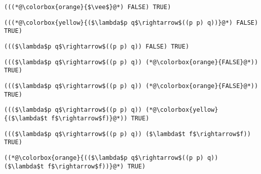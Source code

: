 \documentclass{beamer}
\begin{document}
\begin{frame}[fragile]{\CurrentSection}
\lstset{basicstyle=\ttfamily\small}\lstset{numbers=none}\lstset{language=ML}\begin{lstlisting}
(((*@\colorbox{orange}{$\vee$}@*) FALSE) TRUE)
\end{lstlisting}
\pause\lstset{language=ML}\begin{lstlisting}
(((*@\colorbox{yellow}{($\lambda$p q$\rightarrow$((p p) q))}@*) FALSE) TRUE)
\end{lstlisting}

\end{frame}

\begin{frame}[fragile]{\CurrentSection}
\lstset{basicstyle=\ttfamily\small}\lstset{numbers=none}\lstset{language=ML}\begin{lstlisting}
((($\lambda$p q$\rightarrow$((p p) q)) FALSE) TRUE)
\end{lstlisting}
\pause\lstset{language=ML}\begin{lstlisting}
((($\lambda$p q$\rightarrow$((p p) q)) (*@\colorbox{orange}{FALSE}@*)) TRUE)
\end{lstlisting}

\end{frame}

\begin{frame}[fragile]{\CurrentSection}
\lstset{basicstyle=\ttfamily\small}\lstset{numbers=none}\lstset{language=ML}\begin{lstlisting}
((($\lambda$p q$\rightarrow$((p p) q)) (*@\colorbox{orange}{FALSE}@*)) TRUE)
\end{lstlisting}
\pause\lstset{language=ML}\begin{lstlisting}
((($\lambda$p q$\rightarrow$((p p) q)) (*@\colorbox{yellow}{($\lambda$t f$\rightarrow$f)}@*)) TRUE)
\end{lstlisting}

\end{frame}

\begin{frame}[fragile]{\CurrentSection}
\lstset{basicstyle=\ttfamily\small}\lstset{numbers=none}\lstset{language=ML}\begin{lstlisting}
((($\lambda$p q$\rightarrow$((p p) q)) ($\lambda$t f$\rightarrow$f)) TRUE)
\end{lstlisting}
\pause\lstset{language=ML}\begin{lstlisting}
((*@\colorbox{orange}{(($\lambda$p q$\rightarrow$((p p) q)) ($\lambda$t f$\rightarrow$f))}@*) TRUE)
\end{lstlisting}

\end{frame}
\end{document}
